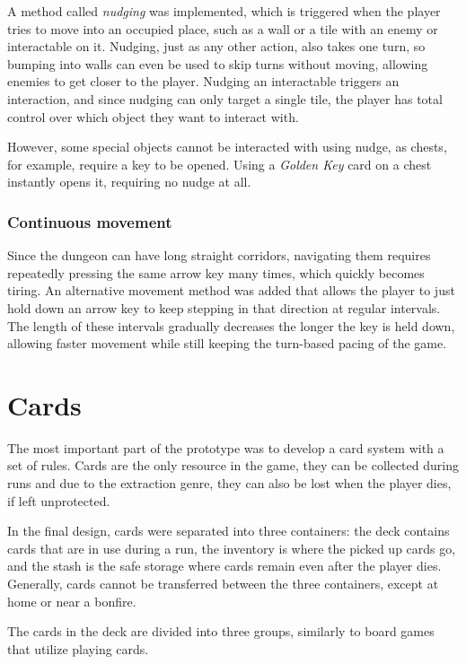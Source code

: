 A method called \textit{nudging} was implemented, which is triggered when the player tries to move into an occupied place, such as a wall or a tile with an enemy or interactable on it. Nudging, just as any other action, also takes one turn, so bumping into walls can even be used to skip turns without moving, allowing enemies to get closer to the player. Nudging an interactable triggers an interaction, and since nudging can only target a single tile, the player has total control over which object they want to interact with.

However, some special objects cannot be interacted with using nudge, as chests, for example, require a key to be opened. Using a \textit{Golden Key} card on a chest instantly opens it, requiring no nudge at all.



\subsubsection{Continuous movement}

Since the dungeon can have long straight corridors, navigating them requires repeatedly pressing the same arrow key many times, which quickly becomes tiring. An alternative movement method was added that allows the player to just hold down an arrow key to keep stepping in that direction at regular intervals. The length of these intervals gradually decreases the longer the key is held down, allowing faster movement while still keeping the turn-based pacing of the game.



\section{Cards}

The most important part of the prototype was to develop a card system with a set of rules. Cards are the only resource in the game, they can be collected during runs and due to the extraction genre, they can also be lost when the player dies, if left unprotected.

In the final design, cards were separated into three containers: the deck contains cards that are in use during a run, the inventory is where the picked up cards go, and the stash is the safe storage where cards remain even after the player dies. Generally, cards cannot be transferred between the three containers, except at home or near a bonfire.

The cards in the deck are divided into three groups, similarly to board games that utilize playing cards.

